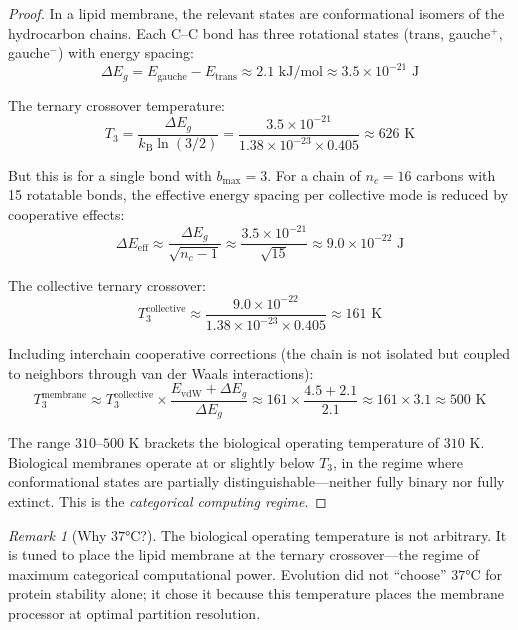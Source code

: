 \documentclass[twocolumn,10pt]{article}
\theoremstyle{remark}
\newtheorem{remark}[theorem]{Remark}
\newcommand{\kB}{k_{\mathrm{B}}}
\begin{document}
\begin{proof}
In a lipid membrane, the relevant states are conformational isomers of the hydrocarbon chains. Each C--C bond has three rotational states (trans, gauche$^+$, gauche$^-$) with energy spacing:
\begin{equation}
    \Delta E_g = E_{\text{gauche}} - E_{\text{trans}} \approx 2.1 \text{ kJ/mol} \approx 3.5 \times 10^{-21} \text{ J}
\end{equation}

The ternary crossover temperature:
\begin{equation}
    T_3 = \frac{\Delta E_g}{\kB \ln(3/2)} = \frac{3.5 \times 10^{-21}}{1.38 \times 10^{-23} \times 0.405} \approx 626 \text{ K}
\end{equation}

But this is for a single bond with $b_{\max} = 3$. For a chain of $n_c = 16$ carbons with 15 rotatable bonds, the effective energy spacing per collective mode is reduced by cooperative effects:
\begin{equation}
    \Delta E_{\text{eff}} \approx \frac{\Delta E_g}{\sqrt{n_c - 1}} \approx \frac{3.5 \times 10^{-21}}{\sqrt{15}} \approx 9.0 \times 10^{-22} \text{ J}
\end{equation}

The collective ternary crossover:
\begin{equation}
    T_3^{\text{collective}} \approx \frac{9.0 \times 10^{-22}}{1.38 \times 10^{-23} \times 0.405} \approx 161 \text{ K}
\end{equation}

Including interchain cooperative corrections (the chain is not isolated but coupled to neighbors through van der Waals interactions):
\begin{equation}
    T_3^{\text{membrane}} \approx T_3^{\text{collective}} \times \frac{E_{\text{vdW}} + \Delta E_g}{\Delta E_g} \approx 161 \times \frac{4.5 + 2.1}{2.1} \approx 161 \times 3.1 \approx 500 \text{ K}
\end{equation}

The range $310$--$500$ K brackets the biological operating temperature of $310$ K. Biological membranes operate at or slightly below $T_3$, in the regime where conformational states are partially distinguishable---neither fully binary nor fully extinct. This is the \emph{categorical computing regime}.
\end{proof}

\begin{remark}[Why $37°$C?]
The biological operating temperature is not arbitrary. It is tuned to place the lipid membrane at the ternary crossover---the regime of maximum categorical computational power. Evolution did not ``choose'' $37°$C for protein stability alone; it chose it because this temperature places the membrane processor at optimal partition resolution.
\end{remark}
\end{document}
